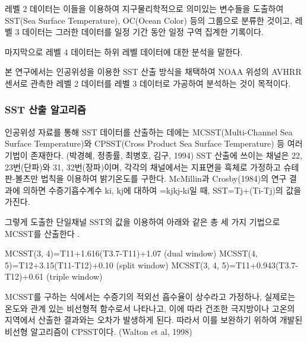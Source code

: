 레벨 2 데이터는 이들을 이용하여 지구물리학적으로 의미있는 변수들을 도출하여 SST(Sea Surface Temperature), OC(Ocean Color) 등의 그룹으로 분류한 것이고, 레벨 3 데이터는 그러한 데이터를 일정 기간 동안 일정 구역 집계한 기록이다. 

마지막으로 레벨 4 데이터는 하위 레벨 데이터에 대한 분석을 말한다. 

본 연구에서는 인공위성을 이용한 SST 산출 방식을 채택하여 NOAA 위성의 AVHRR 센서로 관측한 레벨 2 데이터를 레벨 3 데이터로 가공하여 분석하는 것이 목적이다. 

\subsubsection{SST 산출 알고리즘}

인공위성 자료를 통해 SST 데이터를 산출하는 데에는 MCSST(Multi-Channel Sea Surface Temperature)와 CPSST(Cross Product Sea Surface Temperature) 등 여러 기법이 존재한다. (박경혜, 정종률, 최병호, 김구, 1994) SST 산출에 쓰이는 채널은 22, 23번(단파)와 31, 32번(장파)이며, 각각의 채널에서는 지표면을 흑체로 가정하고 슈테판-볼츠만 법칙을 이용하여 밝기온도를 구한다. McMillin과 Crosby(1984)의 연구 결과에 의하면 수증기흡수계수 ki, kj에 대하여 =kjkj-ki일 때, SST=Tj+(Ti-Tj)의 값을 가진다. 

그렇게 도출한 단일채널 SST의 값을 이용하여 아래와 같은 총 세 가지 기법으로 MCSST를 산출한다 \cite{walton1988nonlinear}. 

MCSST(3, 4)=T11+1.616(T3.7-T11)+1.07 (dual window)
MCSST(4, 5)=T12+3.15(T11-T12)+0.10 (split window)
MCSST(3, 4, 5)=T11+0.943(T3.7-T12)+0.61 (triple window)

MCSST를 구하는 식에서는 수증기의 적외선 흡수율이 상수라고 가정하나, 실제로는 온도와 관계 있는 비선형적 함수로서 나타나고, 이에 따라 건조한 극지방이나 고온의 지역에서 산출한 결과와는 오차가 발생하게 된다. 따라서 이를 보완하기 위하여 개발된 비선형 알고리즘이 CPSST이다. (Walton et al, 1998)
